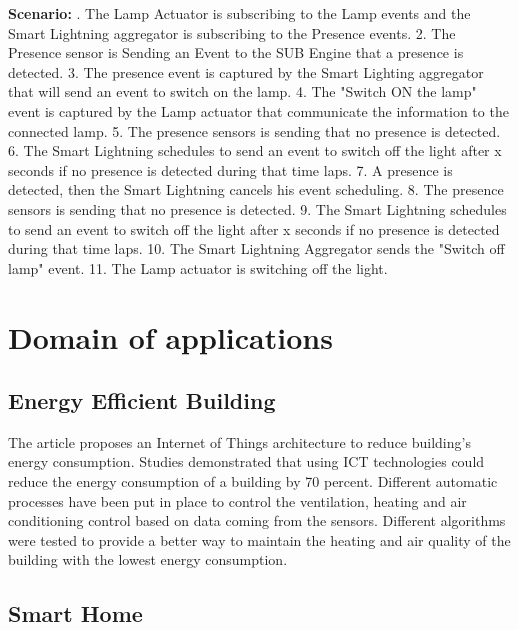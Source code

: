 \documentclass[11pt]{article}
\begin{document}
\newline
\newline
\textbf{Scenario:}
. The Lamp Actuator is subscribing to the Lamp events and the Smart Lightning aggregator is subscribing to the Presence events.
2. The Presence sensor is Sending an Event to the SUB Engine that a presence is detected. 
3. The presence event is captured by the Smart Lighting aggregator that will send an event to switch on the lamp. 
4. The "Switch ON the lamp" event is captured by the Lamp actuator that communicate the information to the connected lamp. 
5. The presence sensors is sending that no presence is detected. 
6. The Smart Lightning schedules to send an event to switch off the light after x seconds if no presence is detected during that time laps.
7. A presence is detected, then the Smart Lightning cancels his event scheduling.
8. The presence sensors is sending that no presence is detected. 
9. The Smart Lightning schedules to send an event to switch off the light after x seconds if no presence is detected during that time laps.
10. The Smart Lightning Aggregator sends the "Switch off lamp" event.
11. The Lamp actuator is switching off the light.

\section{Domain of applications} \label{domain-applications}

\subsection{Energy Efficient Building}

The article \cite{Towards-a-context-driven-platform} proposes an Internet of Things architecture to reduce building's energy consumption. Studies demonstrated that using ICT technologies could reduce the energy consumption of a building by 70 percent. Different automatic processes have been put in place to control the ventilation, heating and air conditioning control based on data coming from the sensors. Different algorithms were tested to provide a better way to maintain the heating and air quality of the building with the lowest energy consumption.

\subsection{Smart Home}
\end{document}
